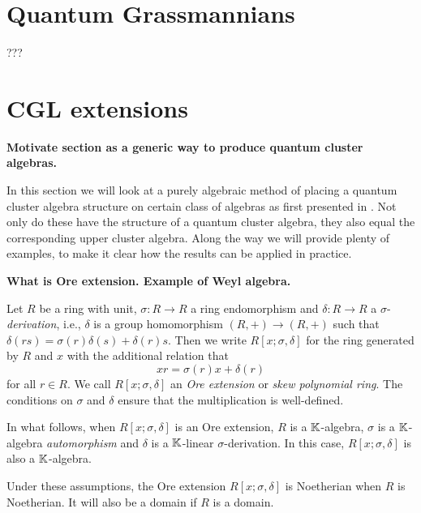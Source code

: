 \section{Quantum Grassmannians}
???

\section{CGL extensions}

\textbf{Motivate section as a generic way to produce quantum cluster algebras.}

In this section we will look at a purely algebraic method of placing a quantum cluster
algebra structure on certain class of algebras as first presented in
\cite{GoodearlYakimov2017QCA}. Not only do these have the structure of a quantum
cluster algebra, they also equal the corresponding upper cluster algebra. Along the way
we will provide plenty of examples, to make it clear how the results can be applied in
practice.

\textbf{What is Ore extension. Example of Weyl algebra.}
\begin{definition}
	Let $R$ be a ring with unit, $\sigma \colon R \to R$ a ring endomorphism and
	$\delta \colon R \to R$ a $\sigma$-\emph{derivation}, i.e.,
	$\delta$ is a group homomorphism $(R, +) \to (R, +)$ such that $\delta (r s) =
		\sigma(r)\delta(s) + \delta(r) s$. Then we write $R[x;\sigma, \delta]$ for the ring generated by $R$ and $x$ with the additional relation that
	\begin{equation*}
		x r = \sigma(r) x + \delta(r)
	\end{equation*}
	for all $r \in R$. We call $R[x;\sigma, \delta]$ an \emph{Ore extension} or \emph{skew polynomial ring}. The conditions
	on $\sigma$ and $\delta$ ensure that the multiplication is well-defined.
\end{definition}
%
\begin{convention}
	In what follows, when $R[x;\sigma, \delta]$ is an Ore extension, $R$ is a
	$\mathbb{K}$-algebra, $\sigma$ is a $\mathbb{K}$-algebra \emph{automorphism} and $\delta$ is a
	$\mathbb{K}$-linear $\sigma$-derivation. In this case, $R[x;\sigma, \delta]$ is also a
	$\mathbb{K}$-algebra.
\end{convention}
%
Under these assumptions, the Ore extension $R[x; \sigma, \delta]$ is Noetherian when
$R$ is Noetherian. It will also be a domain if $R$ is a domain.


